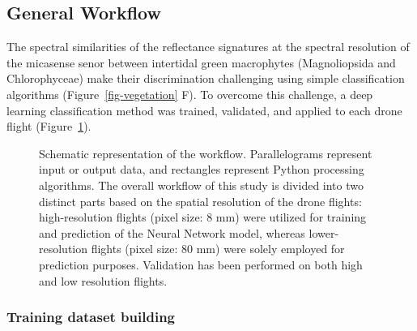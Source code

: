 \documentclass[
  number]{elsarticle}
\begin{document}
\subsection{General Workflow}\label{general-workflow}

The spectral similarities of the reflectance signatures at the spectral
resolution of the micasense senor between intertidal green macrophytes
(Magnoliopsida and Chlorophyceae) make their discrimination challenging
using simple classification algorithms (Figure~\ref{fig-vegetation} F).
To overcome this challenge, a deep learning classification method was
trained, validated, and applied to each drone flight
(Figure~\ref{fig-workflow}).

\label{cell-fig-workflow}
\begin{figure}[H]


\caption{\label{fig-workflow}Schematic representation of the workflow.
Parallelograms represent input or output data, and rectangles represent
Python processing algorithms. The overall workflow of this study is
divided into two distinct parts based on the spatial resolution of the
drone flights: high-resolution flights (pixel size: 8 mm) were utilized
for training and prediction of the Neural Network model, whereas
lower-resolution flights (pixel size: 80 mm) were solely employed for
prediction purposes. Validation has been performed on both high and low
resolution flights.}

\end{figure}%

\subsubsection{Training dataset
building}\label{training-dataset-building}
\end{document}
